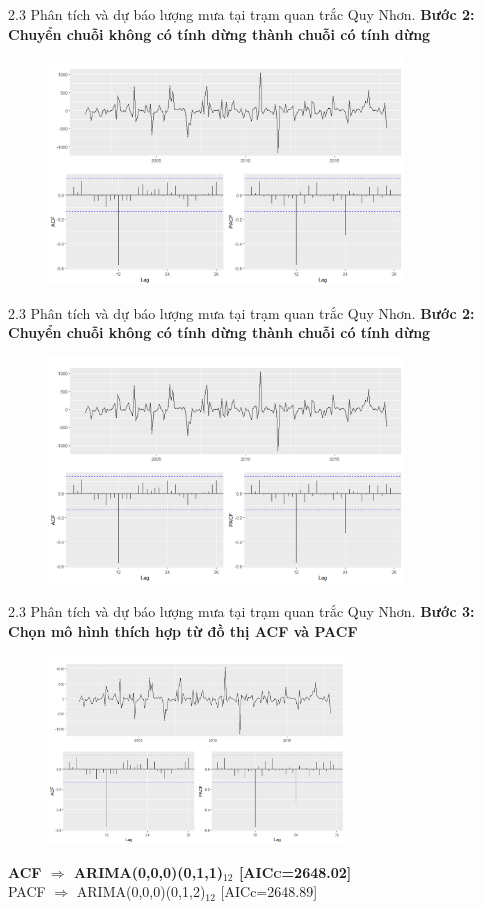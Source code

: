 \documentclass[notheorems,envcountsect,hyperref=unicode]{beamer}
\begin{document}
\begin{frame}{2.3 Phân tích và dự báo lượng mưa tại trạm quan trắc Quy Nhơn.}
	\textbf{Bước 2: Chuyển chuỗi không có tính dừng thành chuỗi có tính dừng}
	\begin{figure}[!htb]
		\centering
		\includegraphics[width=1\linewidth,height=6cm]{V6} 
	\end{figure}
\end{frame}

\begin{frame}{2.3 Phân tích và dự báo lượng mưa tại trạm quan trắc Quy Nhơn.}
	\textbf{Bước 2: Chuyển chuỗi không có tính dừng thành chuỗi có tính dừng}
	\begin{figure}[!htb]
		\centering
		\includegraphics[width=1\linewidth,height=6cm]{V6} 
	\end{figure}
\end{frame}

\begin{frame}{2.3 Phân tích và dự báo lượng mưa tại trạm quan trắc Quy Nhơn.}
	\textbf{Bước 3: Chọn mô hình thích hợp từ đồ thị ACF và PACF}
	\begin{figure}[!htb]
		\centering
		\includegraphics[width=1\linewidth,height=5cm]{V6} 
	\end{figure}
\textsc{\bf{ACF $\Longrightarrow$ ARIMA(0,0,0)(0,1,1)$_{12}$ [AICc=2648.02]}}\\
\pause
PACF $\Longrightarrow$ ARIMA(0,0,0)(0,1,2)$_{12}$ [AICc=2648.89]
\end{frame}
\end{document}
